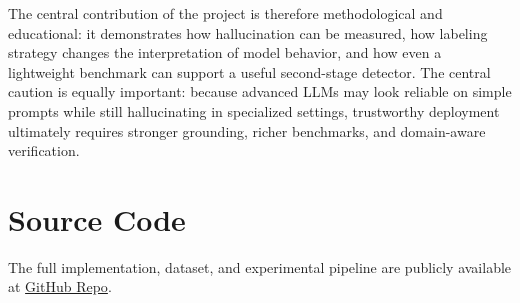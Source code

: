 \documentclass[11pt]{article}
\begin{document}
The central contribution of the project is therefore methodological and educational: it demonstrates how hallucination can be measured, how labeling strategy changes the interpretation of model behavior, and how even a lightweight benchmark can support a useful second-stage detector. The central caution is equally important: because advanced LLMs may look reliable on simple prompts while still hallucinating in specialized settings, trustworthy deployment ultimately requires stronger grounding, richer
benchmarks, and domain-aware verification.

\section{Source Code}

The full implementation, dataset, and experimental pipeline are publicly available at
\href{https://github.com/twok-teks/llm-hallucination-analysis}{GitHub Repo}.

\newpage


\end{document}
